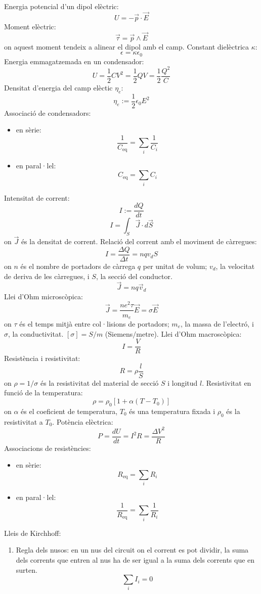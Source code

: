 \documentclass[../../../main.tex]{subfiles}
\begin{document}
\begin{multicols}{2}
    Energia potencial d'un dipol elèctric: $$U=-\Vec{p}\cdot\Vec{E}$$
    Moment elèctric: $$\Vec{\tau}=\Vec{p}\wedge\Vec{E}$$ {on aquest moment tendeix a alinear el dipol amb el camp.}\newline
    Constant dielèctrica $\kappa$: $$\epsilon=\kappa\epsilon_0$$
    Energia emmagatzemada en un condensador: $$U=\frac{1}{2}CV^2=\frac{1}{2}QV=\frac{1}{2}\frac{Q^2}{C}$$
    Densitat d'energia del camp elèctic $\eta_e$: $$\eta_e:=\frac{1}{2}\epsilon_0E^2$$
    Associació de condensadors:
    \begin{itemize}
        \item en sèrie:$$\frac{1}{C_{\text{eq}}}=\sum_i\frac{1}{C_i}$$
        \item en paral·lel: $$C_{\text{eq}}=\sum_iC_i$$
    \end{itemize}
    Intensitat de corrent: $$I:=\frac{dQ}{dt}$$
    $$I=\int_S \Vec{J}\cdot d\Vec{S}$$ {on $\Vec{J}$ és la densitat de corrent.}\newline
    Relació del corrent amb el moviment de càrregues:
    $$I=\frac{\Delta Q}{\Delta t}=nqv_dS$$ {on $n$ és el nombre de portadors de càrrega $q$ per unitat de volum; $v_d$, la velocitat de deriva de les càrregues, i $S$, la secció del conductor.}
    $$\Vec{J}=nq\Vec{v}_d$$
    Llei d'Ohm microscòpica: $$\Vec{J}=\frac{ne^2\tau}{m_e}\Vec{E}=\sigma\Vec{E}$$ {on $\tau$ és el temps mitjà entre col·lisions de portadors; $m_e$, la massa de l'electró, i $\sigma$, la conductivitat. $[\sigma]=S/m$ (Siemens$/$metre).}\newline
    Llei d'Ohm macroscòpica: $$I=\frac{V}{R}$$
    Resistència i resistivitat: $$R=\rho\frac{l}{S}$$ {on $\rho=1/\sigma$ és la resistivitat del material de secció $S$ i longitud $l$.}\newline
    Resistivitat en funció de la temperatura: $$\rho=\rho_0[1+\alpha(T-T_0)]$$ {on $\alpha$ és el coeficient de temperatura, $T_0$ és una temperatura fixada i $\rho_0$ és la resistivitat a $T_0$.}\newline
    Potència elèctrica: $$P=\frac{dU}{dt}=I^2R=\frac{\Delta V^2}{R}$$
    Associacions de resistències:
    \begin{itemize}
        \item en sèrie:$$R_{\text{eq}}=\sum_iR_i$$
        \item en paral·lel: $$\frac{1}{R_{\text{eq}}}=\sum_i\frac{1}{R_i}$$
    \end{itemize}
    Lleis de Kirchhoff:
    \begin{enumerate}
        \item Regla dels nusos: en un nus del circuit on el corrent es pot dividir, la suma dels corrents que entren al nus ha de ser igual a la suma dels corrents que en surten. $$\sum_iI_i=0$$

\end{enumerate}
\end{multicols}
\end{document}
